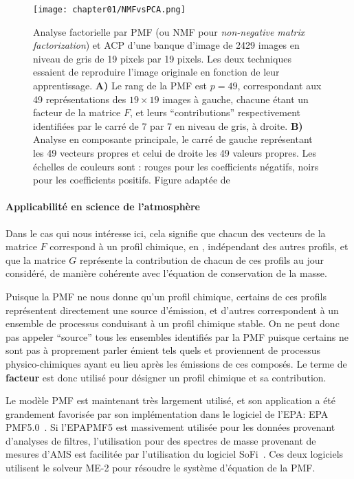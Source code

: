 \begin{figure}[ht]
    \centering
    \texttt{[image: chapter01/NMFvsPCA.png]}
    \caption{Analyse factorielle par PMF (ou NMF pour \textit{non-negative matrix
    factorization}) et ACP d'une banque d'image de 2429 images en niveau de gris de 19
    pixels par 19 pixels. Les deux techniques essaient de reproduire l'image originale en
    fonction de leur apprentissage.
    \textbf{A)} Le rang de la PMF est $p=49$, correspondant aux 49
    représentations des $19\times19$ images à gauche, chacune étant un facteur de la
    matrice $F$, et leurs ``contributions'' respectivement identifiées par le carré de 7 par
    7 en niveau de gris, à droite.
    \textbf{B)} Analyse en composante principale, le carré de gauche représentant les 49
    vecteurs propres et celui de droite les 49 valeurs propres.
    Les échelles de couleurs sont : rouges pour les coefficients négatifs, noirs pour les
    coefficients positifs.
    Figure adaptée de \cite{leeLearning1999}}%
    \label{fig:chapter01/NMFvsPCA}
\end{figure}

\paragraph{Applicabilité en science de l'atmosphère}%
\label{par:applicabilité_en_science_de_l_atmosphère}

Dans le cas qui nous intéresse ici, cela signifie que chacun des vecteurs de la matrice
$F$ correspond à un profil chimique, en \si{\ugm}, indépendant des autres profils, et
que la matrice $G$ représente la contribution de chacun de ces profils au jour
considéré, de manière cohérente avec l'équation de conservation de la masse.

Puisque la PMF ne nous donne qu'un profil chimique, certains de ces profils représentent
directement une source d'émission, et d'autres correspondent à un ensemble de processus
conduisant à un profil chimique stable. On ne peut donc pas appeler ``source'' tous les ensembles
identifiés par la PMF puisque certains ne sont pas à proprement parler émient tels quels et
proviennent de processus physico-chimiques ayant eu lieu après les émissions de ces
composés.
Le terme de \textbf{facteur} est donc utilisé pour désigner un profil chimique et sa
contribution.

Le modèle PMF est maintenant très largement utilisé, et son application a été grandement
favorisée
par son implémentation dans le logiciel de l'EPA: EPA PMF5.0~\autocite{norrisEPA2014}.
Si l'EPAPMF5 est massivement utilisée pour les données provenant d'analyses de
filtres, l'utilisation pour des spectres de masse provenant de mesures d'AMS est facilitée par
l'utilisation du logiciel SoFi~\autocite{canonacoSoFi2013}. Ces deux logiciels utilisent
le solveur ME-2 pour résoudre le système d'équation de la PMF.

